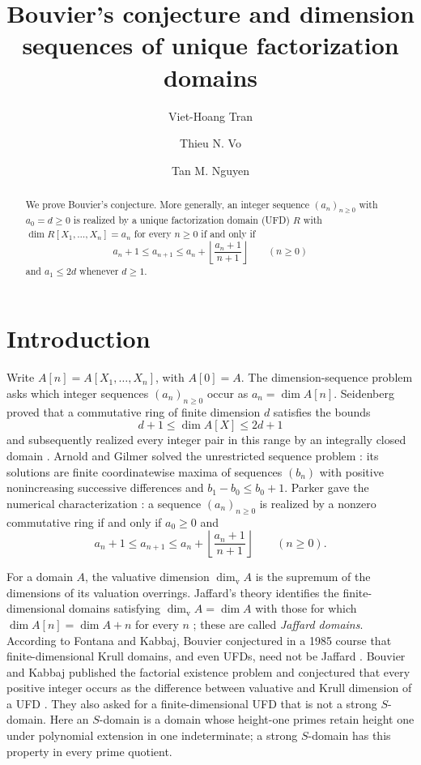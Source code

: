\documentclass[11pt,reqno]{amsart}
\title[Bouvier's conjecture and dimension sequences of UFDs]{Bouvier's conjecture and dimension sequences of unique factorization domains}
\author{Viet-Hoang Tran}
\author{Thieu N. Vo}
\author{Tan M. Nguyen}
\date{}
\numberwithin{equation}{section}
\theoremstyle{plain}
\theoremstyle{definition}
\theoremstyle{remark}
\begin{document}
\raggedbottom

\begin{abstract}
We prove Bouvier's conjecture. More generally, an integer sequence
\((a_n)_{n\ge0}\) with \(a_0=d\ge0\) is realized by a unique factorization domain (UFD) \(R\)
with \(\dim R[X_1,\ldots,X_n]=a_n\) for every \(n\ge0\) if and only if
\[
 a_n+1\le a_{n+1}\le
 a_n+\left\lfloor\frac{a_n+1}{n+1}\right\rfloor
 \qquad(n\ge0)
\]
and \(a_1\le2d\) whenever \(d\ge1\).
\end{abstract}

\maketitle

\section{Introduction}\label{sec:introduction}

Write \(A[n]=A[X_1,\ldots,X_n]\), with \(A[0]=A\).
The dimension-sequence problem asks which integer sequences
\((a_n)_{n\ge0}\) occur as \(a_n=\dim A[n]\).
Seidenberg proved that a commutative ring of finite dimension \(d\)
satisfies the bounds \cite{Seidenberg1953}
\[
 d+1\le\dim A[X]\le2d+1
\]
and subsequently realized every integer pair in this range by an integrally closed domain
\cite[Theorem~3]{Seidenberg1954}.
Arnold and Gilmer solved the unrestricted sequence problem
\cite{ArnoldGilmer1973,ArnoldGilmer1974}: its solutions are finite
coordinatewise maxima of sequences \((b_n)\) with positive
nonincreasing successive differences and \(b_1-b_0\le b_0+1\).
Parker gave the numerical characterization \cite{Parker1975}:
a sequence \((a_n)_{n\ge0}\) is realized by a nonzero commutative
ring if and only if \(a_0\ge0\) and
\begin{equation}\label{eq:P}
 a_n+1\le a_{n+1}\le
 a_n+\left\lfloor\frac{a_n+1}{n+1}\right\rfloor
 \qquad(n\ge0).
\end{equation}

For a domain \(A\), the valuative dimension \(\dim_{\mathrm v}A\)
is the supremum of the dimensions of its valuation overrings.
Jaffard's theory identifies the finite-dimensional domains satisfying
\(\dim_{\mathrm v}A=\dim A\) with those for which
\(\dim A[n]=\dim A+n\) for every \(n\)
\cite{Jaffard1960}; these are called \emph{Jaffard domains}.
According to Fontana and Kabbaj, Bouvier conjectured in a 1985
course that finite-dimensional Krull domains, and even UFDs, need
not be Jaffard \cite{FontanaKabbaj2004}.
Bouvier and Kabbaj published the factorial existence problem and
conjectured that every positive integer occurs as the difference
between valuative and Krull dimension of a UFD
\cite[p.~163]{BouvierKabbaj1988}.
They also asked for a finite-dimensional UFD that is not a
strong \(S\)-domain.
Here an \(S\)-domain is a domain whose height-one primes retain
height one under polynomial extension in one indeterminate;
a strong \(S\)-domain has this property in every prime quotient.
\end{document}
